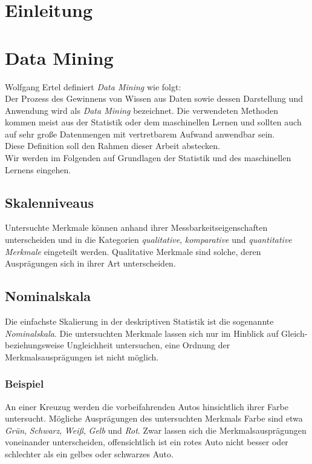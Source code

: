 \documentclass[a4paper]{scrartcl}
\begin{document}
    \begin{multicols}{2}
        \section{Einleitung}
        \section{Data Mining}
            Wolfgang Ertel definiert \emph{Data Mining} wie folgt:\\
            Der Prozess des Gewinnens von Wissen aus Daten sowie dessen Darstellung und Anwendung wird als \emph{Data Mining} bezeichnet. Die verwendeten Methoden kommen meist aus der Statistik oder dem maschinellen Lernen und sollten auch auf sehr große Datenmengen mit vertretbarem Aufwand anwendbar sein.\\
            
            Diese Definition soll den Rahmen dieser Arbeit abstecken.\\
            Wir werden im Folgenden auf Grundlagen der Statistik und des maschinellen Lernens eingehen.
            \subsection{Skalenniveaus}
                Untersuchte Merkmale können anhand ihrer Messbarkeitseigenschaften unterscheiden und in die Kategorien \emph{qualitative}, \emph{komparative} und \emph{quantitative Merkmale} eingeteilt werden.
                Qualitative Merkmale sind solche, deren Ausprägungen sich in ihrer Art unterscheiden. 
                \cite{kohn2005}
            \subsection{Nominalskala}
                Die einfachste Skalierung in der deskriptiven Statistik ist die sogenannte \emph{Nominalskala}. Die untersuchten Merkmale lassen sich nur im Hinblick auf Gleich- beziehungsweise Ungleichheit untersuchen, eine Ordnung der Merkmalsausprägungen ist nicht möglich. 
                \cite{kohn2005}
                \subsubsection{Beispiel}
                    An einer Kreuzug werden die vorbeifahrenden Autos hinsichtlich ihrer Farbe untersucht. Mögliche Ausprägungen des untersuchten Merkmals Farbe sind etwa \emph{Grün}, \emph{Schwarz}, \emph{Weiß}, \emph{Gelb} und \emph{Rot}. Zwar lassen sich die Merkmalsausprägungen voneinander unterscheiden, offensichtlich ist ein rotes Auto nicht besser oder schlechter als ein gelbes oder schwarzes Auto.

\end{multicols}
\end{document}
